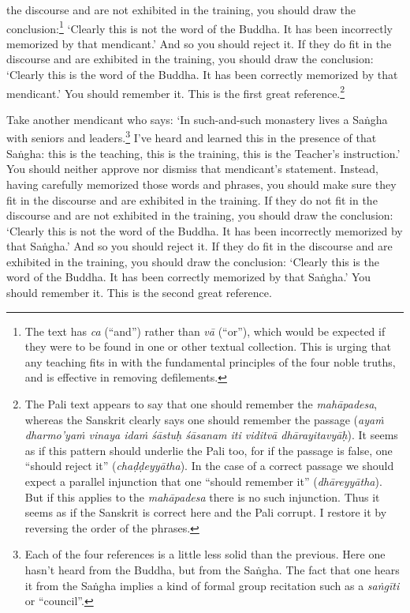 \documentclass[12pt,openany]{book}%
\begin{document}
the discourse and are not exhibited in the training, you should draw the conclusion:\footnote{The text has \textit{ca} (“and”) rather than \textit{\textsanskrit{vā}} (“or”), which would be expected if they were to be found in one or other textual collection. This is urging that any teaching fits in with the fundamental principles of the four noble truths, and is effective in removing defilements. } ‘Clearly this is not the word of the Buddha. It has been incorrectly memorized by that mendicant.’ And so you should reject it. If they do fit in the discourse and are exhibited in the training, you should draw the conclusion: ‘Clearly this is the word of the Buddha. It has been correctly memorized by that mendicant.’ You should remember it. This is the first great reference.\footnote{The Pali text appears to say that one should remember the \textit{\textsanskrit{mahāpadesa}}, whereas the Sanskrit clearly says one should remember the passage (\textit{\textsanskrit{ayaṁ} dharmo’\textsanskrit{yaṁ} vinaya \textsanskrit{idaṁ} \textsanskrit{śāstuḥ} \textsanskrit{śāsanam} iti \textsanskrit{viditvā} \textsanskrit{dhārayitavyāḥ}}). It seems as if this pattern should underlie the Pali too, for if the passage is false, one “should reject it” (\textit{\textsanskrit{chaḍḍeyyātha}}). In the case of a correct passage we should expect a parallel injunction that one “should remember it” (\textit{\textsanskrit{dhāreyyātha}}). But if this applies to the \textit{\textsanskrit{mahāpadesa}} there is no such injunction. Thus it seems as if the Sanskrit is correct here and the Pali corrupt. I restore it by reversing the order of the phrases. } 

Take another mendicant who says: ‘In such-and-such monastery lives a \textsanskrit{Saṅgha} with seniors and leaders.\footnote{Each of the four references is a little less solid than the previous. Here one hasn’t heard from the Buddha, but from the \textsanskrit{Saṅgha}. The fact that one hears it from the \textsanskrit{Saṅgha} implies a kind of formal group recitation such as a \textit{\textsanskrit{saṅgīti}} or “council”. } I’ve heard and learned this in the presence of that \textsanskrit{Saṅgha}: this is the teaching, this is the training, this is the Teacher’s instruction.’ You should neither approve nor dismiss that mendicant’s statement. Instead, having carefully memorized those words and phrases, you should make sure they fit in the discourse and are exhibited in the training. If they do not fit in the discourse and are not exhibited in the training, you should draw the conclusion: ‘Clearly this is not the word of the Buddha. It has been incorrectly memorized by that \textsanskrit{Saṅgha}.’ And so you should reject it. If they do fit in the discourse and are exhibited in the training, you should draw the conclusion: ‘Clearly this is the word of the Buddha. It has been correctly memorized by that \textsanskrit{Saṅgha}.’ You should remember it. This is the second great reference. 
\end{document}
